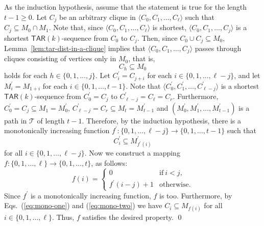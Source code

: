 \documentclass{llncs}
\newcommand{\TAR}[1]{\mathsf{TAR}(#1)}
\newcommand{\ini}{0}
\newcommand{\tar}{r}
\newcommand{\cliq}{C}
\newcounter{one}
\newcounter{two}
\begin{document}
	As the induction hypothesis, assume that the statement is true for the length $t-1 \ge 0$.
	Let $\cliq_j$ be an arbitrary clique in $\langle \cliq_{\ini}, \cliq_1, \ldots, \cliq_{\ell} \rangle$ such that $\cliq_{j} \subseteq M_{0} \cap M_{1}$. 
	Note that, since $\langle \cliq_{\ini}, \cliq_1, \ldots, \cliq_{\ell} \rangle$ is shortest, $\langle \cliq_{\ini}, \cliq_1, \ldots, \cliq_{j} \rangle$ is a shortest $\TAR{k}$-sequence from $\cliq_{\ini}$ to $\cliq_j$. 
	Then, since $\cliq_{\ini} \cup \cliq_{j} \subseteq M_{0}$, Lemma~\ref{lem:tar-dist-in-a-clique} implies that $\langle \cliq_{\ini}, \cliq_1, \ldots, \cliq_{j} \rangle$ passes through cliques consisting of vertices only in $M_{0}$, that is,
	\begin{equation} \label{eq:mono-one}
		\cliq_{h} \subseteq M_{0}
	\end{equation}
holds for each $h \in \{0, 1, \ldots, j\}$.
	Let $\cliq_{i}^\prime = \cliq_{j+i}$ for each $i \in \{0, 1, \ldots, \ell - j\}$, and let $M_{i}^\prime = M_{1+i}$ for each $i \in \{0,1,\ldots, t-1\}$.
	Note that $\langle \cliq_{\ini}^\prime, \cliq_1^\prime, \ldots, \cliq_{\ell-j}^\prime \rangle$ is a shortest $\TAR{k}$-sequence from $\cliq_0^\prime = \cliq_j$ to $\cliq_{\ell-j}^\prime = \cliq_{\ell} = \cliq_{\tar}$. 
	Furthermore, $\cliq_0^\prime = \cliq_j \subseteq M_1 = M_0^\prime$, $\cliq_{\ell-j}^\prime = \cliq_{\tar} \subseteq M_t = M_{t-1}^\prime$ and  $(M_0^\prime, M_1^\prime, \ldots, M_{t-1}^\prime)$ is a path in $\mathcal{T}$ of length $t-1$.
	Therefore, by the induction hypothesis, there is a monotonically increasing function $f^\prime \colon \{0, 1, \dots, \ell-j\} \to \{0, 1, \dots, t-1\}$ such that 
	\begin{equation} \label{eq:mono-two}
		\cliq_{i}^\prime \subseteq M_{f^\prime(i)}^\prime
	\end{equation}
for all $i \in \{0, 1, \dots, \ell-j\}$.
	Now we construct a mapping $f \colon \{0, 1, \dots, \ell\} \to \{0, 1, \dots, t\}$, as follows:
	\[
		f(i) =
			\begin{cases}
			0 & \text{if} \ i < j, \\    
			f^\prime(i - j) + 1 & \text{otherwise}.
			\end{cases}
	\]
	Since $f^\prime$ is a monotonically increasing function, $f$ is too. 
	Furthermore, by Eqs.~(\ref{eq:mono-one}) and (\ref{eq:mono-two}) we have $\cliq_{i} \subseteq M_{f(i)}$ for all $i \in \{0, 1, \dots, \ell\}$.
	Thus, $f$ satisfies the desired property.
	\qed
\end{document}
